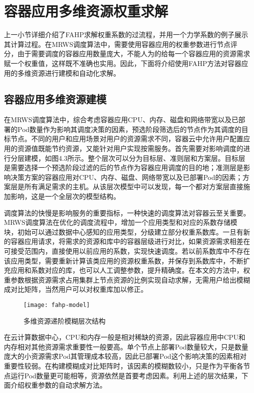 \section{容器应用多维资源权重求解}
上一小节详细介绍了FAHP求解权重系数的过流程，并用一个力学系数的例子展示其计算过程。在MRWS调度算法中，需要使用容器应用的权重参数进行节点评分，由于需要调度的容器应用数量庞大，不能人为的给每一个容器应用的资源需求赋一个权重值，这样既不准确也实用。因此，下面将介绍使用FAHP方法对容器应用的多维资源进行建模和自动化求解。
\subsection{容器应用多维资源建模}
在MRWS调度算法中，综合考虑容器应用CPU、内存、磁盘和网络带宽以及已部署的Pod数量作为影响其调度决策的因素，预选阶段筛选后的节点作为其调度的目标节点。不同的用户和应用场景对用户的资源需求不同，容器云中允许用户配置应用的资源值既能节约资源，又能针对用户实现按需服务。首先需要对影响调度的进行分层建模，如图4.3所示。整个层次可以分为目标层、准则层和方案层。目标层是需要选择一个预选阶段过滤的后的节点作为容器应用调度的目的地；准测层是影响决策方案的容器应用对CPU、内存、磁盘、网络带宽以及已部署Pod的因素；方案层是所有满足需求的主机。从该层次模型中可以发现，每一个都对方案层直接施加影响，这是一个全层次的模型结构。

调度算法的快慢是影响服务的重要指标，一种快速的调度算法对容器云至关重要。MRWS调度算法在优化的调度流程中，增加一个应用类型和对应的系数存储模块，初始可以通过数据中心感知的应用类型，分级建立部分权重系数库。一旦有新的容器应用请求，将需求的资源和库中的容器层级进行对比，如果资源需求相差在可接受范围内，直接使用以前应用的系数，实现快速调度。若以前系数库中不存在该应用类型，需要重新计算该类应用的资源权重系数，并保存到系数库中，不断扩充应用和系数对应的库，也可以人工调整参数，提升精确度。在本文的方法中，权重参数根据资源需求占用集群上节点资源的比例实现自动求解，无需用户给出模糊成对比矩阵，当然用户可以对权重库加以修正。
\begin{figure}[H] %
	\centering
	\texttt{[image: fahp-model]}
	\caption{多维资源递阶模糊层次结构}
	\label{fig:xfig1}
\end{figure}
在云计算数据中心，CPU和内存一般是相对稀缺的资源，因此容器应用中CPU和内存相对其他资源需求重要性一般要高。单个节点上部署Pod数量较大，只是数量庞大的小资源需求Pod其管理成本较高，因此已部署Pod这个影响决策的因素相对重要性较弱。在构建模糊成对比矩阵时，该因素的模糊数较小，只是作为平衡各节点运行Pod数量更可能相等，资源依然是首要考虑因素。利用上述的层次结果，下面介绍权重参数的自动求解方法。

